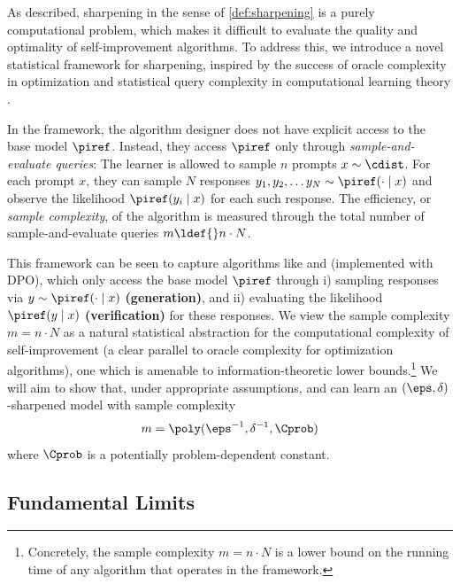 As described, sharpening in the sense of \cref{def:sharpening} is a
purely computational problem, which makes it difficult to evaluate the
quality and optimality of
self-improvement algorithms. To address this, we introduce a novel
statistical
framework for sharpening, inspired by the success of oracle complexity in optimization
\citep{nemirovski1983problem,traub1988information,raginsky2011information,agarwal2012information}
and statistical query complexity in computational learning theory \citep{blum1994weakly,kearns1998efficient,feldman2012complete,feldman2017general}.


\begin{definition}\label{def:oracle-model}
  In the \textbf{\framework} framework, the algorithm designer does
  not have explicit access to the base model $\piref$. Instead, they
access $\piref$ only through \emph{sample-and-evaluate queries}: The learner is allowed to sample $n$ prompts $x \sim
\cdist$. For each prompt $x$, they can sample $N$
responses $y_1,y_2,\dots y_N \sim \piref(\cdot \mid x)$ and observe
the likelihood $\piref(y_i\mid{}x)$ for each such response. The
efficiency, or \emph{sample complexity}, of the algorithm is measured through the total number of
sample-and-evaluate queries
$m\ldef{}n\cdot{}N$.
\end{definition}
This framework can be seen to capture algorithms like \bestofnalg and
\rlhfalg (implemented with DPO), which only
access the base model $\piref$ through i) sampling responses via
$y\sim\piref(\cdot\mid{}x)$ \textbf{(generation)}, and ii) evaluating the likelihood
$\piref(y\mid{}x)$ \textbf{(verification)} for these responses. We view the sample complexity
$m=n\cdot{}N$ as a natural statistical abstraction for the
computational complexity of self-improvement (a clear parallel to oracle complexity for optimization algorithms), one which is amenable to
information-theoretic lower bounds.\footnote{Concretely, the sample
  complexity $m=n\cdot{}N$ is a lower bound on the running time
  of any algorithm that operates in the \framework framework.} We will
aim to show that, under appropriate assumptions, \bestofnalg and
\rlhfalg can learn an $(\eps,\delta)$-sharpened model with 
sample complexity
\[
  m = \poly(\eps^{-1},\delta^{-1},\Cprob)
\]
where $\Cprob$ is a potentially problem-dependent constant.





\subsection{Fundamental Limits}
\label{sec:lower}

